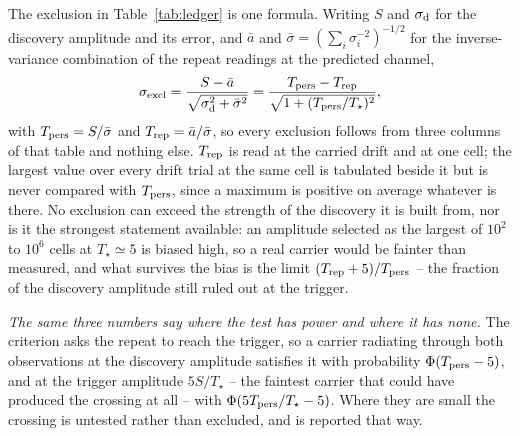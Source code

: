 The exclusion in Table~\ref{tab:ledger} is one formula. Writing $S$ and
$\sigma_{\rm d}$ for the discovery amplitude and its error, and $\bar{a}$ and
$\bar{\sigma}=(\sum_i\sigma_i^{-2})^{-1/2}$ for the inverse-variance
combination of the repeat readings at the predicted channel,
\begin{equation}
\sigma_{\rm excl}=\frac{S-\bar{a}}
{\sqrt{\sigma_{\rm d}^{2}+\bar{\sigma}^{2}}}
=\frac{T_{\rm pers}-T_{\rm rep}}{\sqrt{1+(T_{\rm pers}/T_\star)^{2}}},
\label{eq:excl}
\end{equation}
with $T_{\rm pers}=S/\bar{\sigma}$ and $T_{\rm rep}=\bar{a}/\bar{\sigma}$, so
every exclusion follows from three columns of that table and nothing else.
$T_{\rm rep}$ is read at the carried drift and at one cell; the largest value
over every drift trial at the same cell is tabulated beside it but is never
compared with $T_{\rm pers}$, since a maximum is positive on average whatever
is there. No exclusion can exceed the strength of the discovery it is built
from, nor is it the strongest statement available: an amplitude selected as
the largest of $10^{2}$ to $10^{6}$ cells at $T_\star\simeq5$ is biased high,
so a real carrier would be fainter than measured, and what survives the bias
is the limit $(T_{\rm rep}+5)/T_{\rm pers}$ -- the fraction of the discovery
amplitude still ruled out at the trigger.

\emph{The same three numbers say where the test has power and where it has
none.} The criterion asks the repeat to reach the trigger, so a carrier
radiating through both observations at the discovery amplitude satisfies it
with probability $\Phi(T_{\rm pers}-5)$, and at the trigger amplitude
$5S/T_\star$ -- the faintest carrier that could have produced the crossing
at all -- with $\Phi(5T_{\rm pers}/T_\star-5)$. Where they are small the
crossing is untested rather than excluded, and is reported that way.

